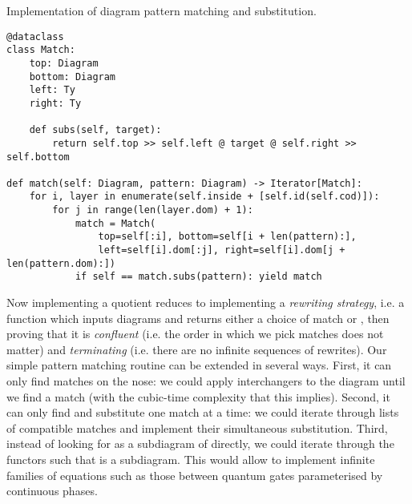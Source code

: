 \begin{python}
{\normalfont Implementation of diagram pattern matching and substitution.}

\begin{verbatim}
@dataclass
class Match:
    top: Diagram
    bottom: Diagram
    left: Ty
    right: Ty

    def subs(self, target):
        return self.top >> self.left @ target @ self.right >> self.bottom

def match(self: Diagram, pattern: Diagram) -> Iterator[Match]:
    for i, layer in enumerate(self.inside + [self.id(self.cod)]):
        for j in range(len(layer.dom) + 1):
            match = Match(
                top=self[:i], bottom=self[i + len(pattern):],
                left=self[i].dom[:j], right=self[i].dom[j + len(pattern.dom):])
            if self == match.subs(pattern): yield match
\end{verbatim}
\end{python}

Now implementing a quotient reduces to implementing a \emph{rewriting strategy}, i.e. a function which inputs diagrams and returns either a choice of match or , then proving that it is \emph{confluent} (i.e. the order in which we pick matches does not matter) and \emph{terminating} (i.e. there are no infinite sequences of rewrites).
Our simple pattern matching routine can be extended in several ways.
First, it can only find matches on the nose: we could apply interchangers to the diagram until we find a match (with the cubic-time complexity that this implies).
Second, it can only find and substitute one match at a time: we could iterate through lists of compatible matches and implement their simultaneous substitution.
Third, instead of looking for  as a subdiagram of  directly, we could iterate through the functors  such that  is a subdiagram.
This would allow to implement infinite families of equations such as those between quantum gates parameterised by continuous phases.

